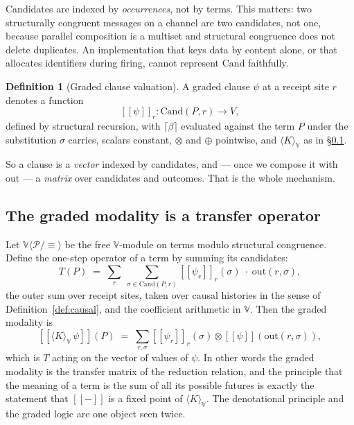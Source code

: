 \documentclass[11pt,a4paper]{article}
\theoremstyle{plain}
\theoremstyle{definition}
\newtheorem{definition}[theorem]{Definition}
\theoremstyle{remark}
\newcommand{\sem}[1]{[\![#1]\!]}
\newcommand{\V}{\mathbb{V}}
\newcommand{\Proc}{\mathcal{P}}
\newcommand{\scong}{\equiv}
\newcommand{\tensorv}{\otimes}
\newcommand{\sumv}{\oplus}
\newcommand{\Cand}{\mathrm{Cand}}
\newcommand{\Out}{\mathrm{out}}
\newcommand{\crisp}[1]{\lceil #1 \rceil}
\begin{document}
Candidates are indexed by \emph{occurrences}, not by terms. This matters: two
structurally congruent messages on a channel are two candidates, not one,
because parallel composition is a multiset and structural congruence does not
delete duplicates. An implementation that keys data by content alone, or that
allocates identifiers during firing, cannot represent $\Cand$ faithfully.

\begin{definition}[Graded clause valuation]\label{def:val}
A graded clause $\psi$ at a receipt site $r$ denotes a function
\[
  \sem{\psi}_r : \Cand(P,r) \longrightarrow V ,
\]
defined by structural recursion, with $\crisp{\beta}$ evaluated against the term
$P$ under the substitution $\sigma$ carries, scalars constant, $\tensorv$ and
$\sumv$ pointwise, and $\langle K \rangle_\V$ as in \S\ref{ssec:modality}.
\end{definition}

So a clause is a \emph{vector} indexed by candidates, and --- once we compose it
with $\Out$ --- a \emph{matrix} over candidates and outcomes. That is the whole
mechanism.

\subsection{The graded modality is a transfer operator}\label{ssec:modality}

Let $\V\langle \Proc/{\scong}\rangle$ be the free $\V$-module on terms modulo
structural congruence. Define the one-step operator of a term by summing its
candidates:
\begin{equation}\label{eq:onestep}
  T(P) \;=\; \sum_{r}\ \sum_{\sigma \in \Cand(P,r)}
    \sem{\psi_r}_r(\sigma)\;\cdot\;\Out(r,\sigma) ,
\end{equation}
the outer sum over receipt sites, taken over causal histories in the sense of
Definition~\ref{def:causal}, and the coefficient arithmetic in $\V$. Then the
graded modality is
\[
  \sem{\langle K \rangle_\V\,\psi}(P)
  \;=\; \sum_{r,\sigma} \sem{\psi_r}_r(\sigma) \tensorv \sem{\psi}(\Out(r,\sigma)),
\]
which is $T$ acting on the vector of values of $\psi$. In other words the graded
modality is the transfer matrix of the reduction relation, and the principle that
the meaning of a term is the sum of all its possible futures is exactly the
statement that $\sem{-}$ is a fixed point of $\langle K\rangle_\V$. The
denotational principle and the graded logic are one object seen twice.

\end{document}
